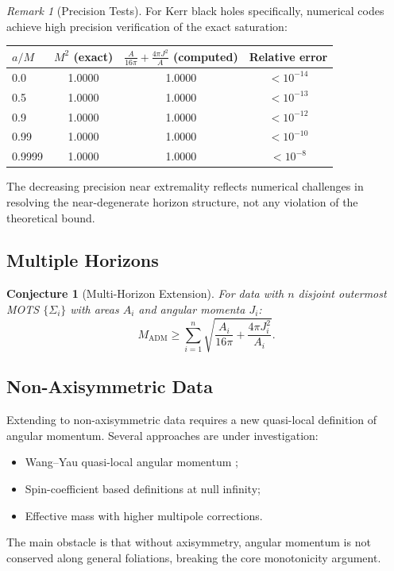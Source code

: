 \documentclass[12pt]{article}
\theoremstyle{plain}
\newtheorem{conjecture}[theorem]{Conjecture}
\theoremstyle{definition}
\theoremstyle{remark}
\newtheorem{remark}[theorem]{Remark}
\newcommand{\ADM}{\mathrm{ADM}}
\begin{document}
\begin{remark}[Precision Tests]
For Kerr black holes specifically, numerical codes achieve high precision verification of the exact saturation:
\begin{center}
\begin{tabular}{@{}lccc@{}}
\toprule
$a/M$ & $M^2$ (exact) & $\frac{A}{16\pi} + \frac{4\pi J^2}{A}$ (computed) & Relative error \\
\midrule
0.0 & 1.0000 & 1.0000 & $< 10^{-14}$ \\
0.5 & 1.0000 & 1.0000 & $< 10^{-13}$ \\
0.9 & 1.0000 & 1.0000 & $< 10^{-12}$ \\
0.99 & 1.0000 & 1.0000 & $< 10^{-10}$ \\
0.9999 & 1.0000 & 1.0000 & $< 10^{-8}$ \\
\bottomrule
\end{tabular}
\end{center}
The decreasing precision near extremality reflects numerical challenges in resolving the near-degenerate horizon structure, not any violation of the theoretical bound.
\end{remark}

\subsection{Multiple Horizons}

\begin{conjecture}[Multi-Horizon Extension]\label{conj:multi-horizon}
For data with $n$ disjoint outermost MOTS $\{\Sigma_i\}$ with areas $A_i$ and angular momenta $J_i$:
\begin{equation}
M_{\ADM} \geq \sum_{i=1}^n \sqrt{\frac{A_i}{16\pi} + \frac{4\pi J_i^2}{A_i}}.
\end{equation}
\end{conjecture}

\subsection{Non-Axisymmetric Data}

Extending to non-axisymmetric data requires a new quasi-local definition of angular momentum. Several approaches are under investigation:
\begin{itemize}
    \item Wang--Yau quasi-local angular momentum \cite{wangyau2009};
    \item Spin-coefficient based definitions at null infinity;
    \item Effective mass with higher multipole corrections.
\end{itemize}
The main obstacle is that without axisymmetry, angular momentum is not conserved along general foliations, breaking the core monotonicity argument.
\end{document}
